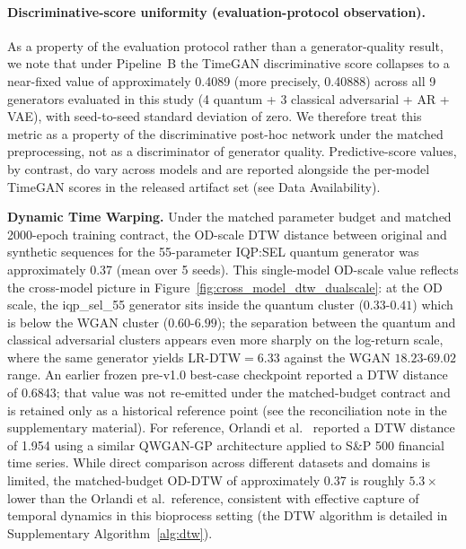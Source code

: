 \documentclass[12pt,twocolumn]{article}
\begin{document}
\paragraph{Discriminative-score uniformity (evaluation-protocol observation).}
As a property of the evaluation protocol rather than a generator-quality
result, we note that under Pipeline~B the TimeGAN discriminative score
collapses to a near-fixed value of approximately 0.4089 (more precisely,
0.40888) across all 9 generators evaluated in this study (4 quantum + 3
classical adversarial + AR + VAE), with seed-to-seed standard deviation of
zero. We therefore treat this metric as a property of the discriminative
post-hoc network under the matched preprocessing, not as a discriminator of
generator quality. Predictive-score values, by contrast, do vary across
models and are reported alongside the per-model TimeGAN scores in the
released artifact set (see Data Availability).

\textbf{Dynamic Time Warping.}
Under the matched parameter budget and matched 2000-epoch training contract,
the OD-scale DTW distance between original and synthetic sequences for the
55-parameter IQP:SEL quantum generator was approximately 0.37 (mean over 5
seeds). This single-model OD-scale value reflects the cross-model picture
in Figure~\ref{fig:cross_model_dtw_dualscale}: at the OD scale, the
iqp\_sel\_55 generator sits inside the quantum cluster ($0.33$-$0.41$)
which is below the WGAN cluster ($0.60$-$6.99$); the separation between
the quantum and classical adversarial clusters appears even more sharply
on the log-return scale, where the same generator yields LR-DTW$=6.33$
against the WGAN $18.23$-$69.02$ range.
An earlier frozen pre-v1.0 best-case checkpoint
reported a DTW distance of 0.6843; that value was not re-emitted under the
matched-budget contract and is retained only as a historical reference point
(see the reconciliation note in the supplementary material).
For reference, Orlandi et al.\ \cite{orlandi2024enhancing} reported a DTW distance of 1.954
using a similar QWGAN-GP architecture applied to S\&P 500 financial time series.
While direct comparison across different datasets and domains is limited, the
matched-budget OD-DTW of approximately 0.37 is roughly $5.3\times$ lower
than the Orlandi et al.\ reference, consistent with effective capture of
temporal dynamics in this bioprocess setting (the DTW algorithm is detailed
in Supplementary Algorithm~\ref{alg:dtw}).
\end{document}
